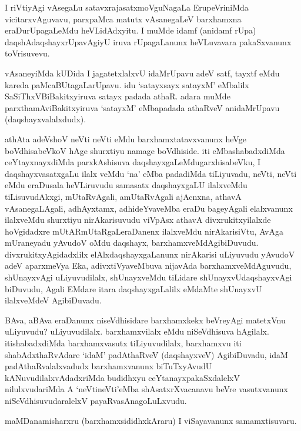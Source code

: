 \begin{artha}
I riVtiyAgi vAsegaLu satavxrajasatxmoVguNagaLa ErupeVriniMda
vicitarx\-vAguvavu, parxpaMca matutx vAsanegaLeV barxhamxna
eraDurUpagaLeMdu heVLidAdxyitu. I muMde idamf (anidamf rUpa)
daqshAdaqshayxrUpavAgiyU iruva rUpagaLanunx heVLuvavara pakaSxvanunx toVrisuvevu.
\end{artha}

\centerline{}

\begin{artha}
 vAsaneyiMda kUDida I jagatetxlalxvU idaMrUpavu adeV satf, tayxtf eMdu kareda paMcaBUtagaLarUpavu. idu `satayxsayx satayxM' eMbalilx SaSiThxVBiBakitxyiruva satayx padada athaR. adara muMde parxthamAviBakitxyiruva `satayxM' eMbapadada athaRveV anidaMrUpavu (daqshayxvalalxdudx).
\end{artha}

\begin{center}
\end{center}

\centerline{}

\begin{artha}
athAta adeVshoV neVti neVti eMdu barxhamxtatavxvanunx heVge
boVdhisabeVkoV hAge shurxtiyu namage boVdhiside. iti eMbashabadxdiMda
ceYtayxnayxdiMda parxkAshisuva daqshayxgaLeMdugarxhisabeVku, I
daqshayxvasatxgaLu ilalx veMdu `na' eMba padadiMda \break tiLiyuvadu, neVti,
neVti eMdu eraDusala heVLiruvudu samasatx daqshayxgaLU \-ilalxveMdu
tiLisuvudAkxgi, mUtaRvAgali, amUtaRvAgali ajAcnxna, athavA
\-vAsanegaLAgali, adhAyxtamx, adhideYvaveMba eraDu bageyAgali
elalxvanunx ilalxveMdu shurxtiyu nirAkarisuvudu viVpAsx athavA
divxrukitxyilalxde hoVgidadxre mUtAR\-mUtaRgaLeraDanenx ilalxveMdu
nirAkarisiVtu, AvAga mUraneyadu yAvudoV oMdu daqshayx,
barxhamxveMdAgibiDuvudu. divxrukitxyAgidadxlilx elAlxdaqshayxgaLanunx
nirAkarisi uLiyuvudu yAvudoV adeV aparxmeVya Eka, adivxtiVyaveMbuva
nijavAda barxhamxveMdAguvudu, shUnayxvAgi uLiyuvudilalx, shUnayxveMdu
tiLidare shUnayxvUdaqshayxvAgi biDuvudu, Agali EMdare itara
daqshayxgaLalilx eMdaMte shUnayxvU ilalxveMdeV AgibiDuvadu.

BAva, aBAva eraDanunx niseVdhisidare barxhamxkekx beVreyAgi matetxVnu
uLiyu\-vudu? uLiyuvudilalx. barxhamxvilalx eMdu niSeVdhisuva
hAgilalx. itishabadxdiMda barxhamx\-vasutx tiLiyuvudilalx, barxhamxvu
iti shabAdxthaRvAdare `idaM' padAthaRveV (daqshayxveV) AgibiDuvadu,
idaM padAthaRvalalxvadudx barxhamxvanunx biTuTxyAvudU
kANuvudilalx\-vAdadxriMda budidhxyu ceYtanayxpakaSxdalelxV nilulxvudariMda A
`neVtineVti'eMba shAsatxrXvacanavu beVre vasutxvanunx
niSeVdhisuvudaralelxV payaRvasAnagoLuLxvudu.

maMDanamisharxru (barxhamxsididhxkAraru) I viSayavanunx
samamxtisuvaru. 
\end{artha}

